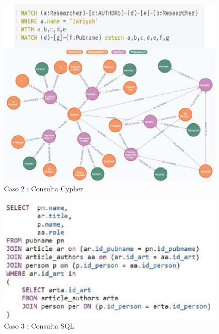 \begin{figure}[H]
    \centering
    \includegraphics[scale=0.7]{Graficos/neo2.png}
    \caption{Caso 2 : Consulta Cypher}
    \label{fig:neo2}
    \end{figure}
\begin{figure}[H]
    \centering
    \includegraphics[scale=0.7]{Graficos/sql2.png}
    \caption{Caso 3 : Consulta SQL}
    \label{fig:sql2}
    \end{figure}
